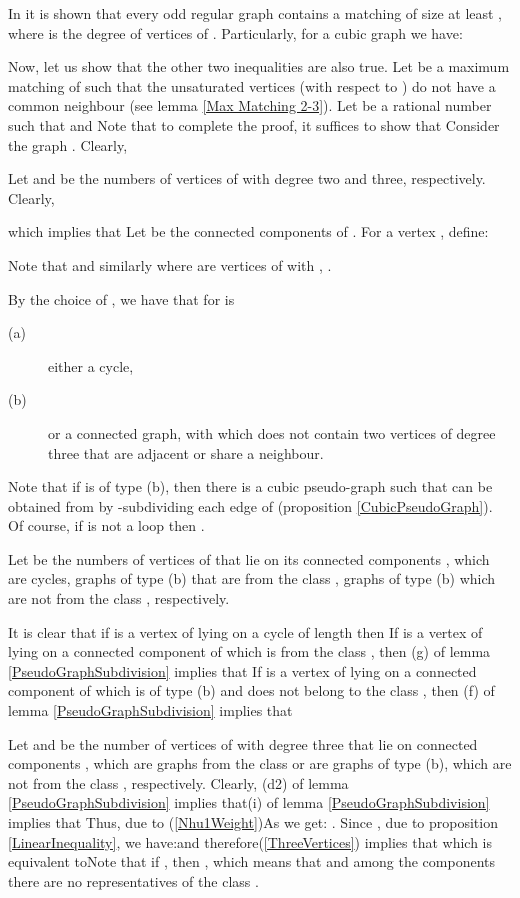 \documentclass[fleqn,12pt,twoside]{article}
\newenvironment{proof}[1][Proof.]{\begin{trivlist}
\item[\hskip \labelsep {\bfseries #1}]}{\end{trivlist}}
\begin{document}
\begin{proof}
In \cite{Takao} it is shown that every odd regular graph 
contains a matching of size at least , where  is the degree of
vertices of . Particularly, for a cubic graph  we have:

Now, let us show that the other two inequalities are also true. Let
 be a
maximum matching of  such that the unsaturated vertices (with respect to ) do not have a common neighbour (see lemma \ref{Max Matching 2-3}). Let  be a rational number such that  and
Note that to complete the proof, it suffices to show that
Consider the graph . Clearly,


Let  and  be the numbers of vertices of  with
degree
two and three, respectively. Clearly,

which implies that
Let  be the connected components of . For a vertex ,  define:


Note that
and similarly
where  are vertices of  with
, .

By the choice of , we have that for   is

\begin{description}
\item[(a)] either a cycle,

\item[(b)] or a connected graph, with 
which does not contain two vertices of degree three that are
adjacent or share a neighbour.
\end{description}

Note that if  is of type (b), then there is a cubic pseudo-graph  such that  can be obtained from  by -subdividing each edge  of  (proposition \ref{CubicPseudoGraph}). Of course, if  is not a loop then .

Let  be the numbers of vertices of  that lie
on its connected components , which are cycles,
graphs of type (b) that are from the class , graphs of
type (b) which are not from the class , respectively.

It is clear that if  is a vertex of  lying on
a cycle of length  then
If  is a vertex of  lying on a connected component  of  which is from the class ,
then (g) of lemma \ref{PseudoGraphSubdivision} implies that
If  is a vertex of  lying on a connected component  of  which is of type (b) and does not belong
to the class , then (f) of lemma
\ref{PseudoGraphSubdivision} implies
that

Let  and  be the number of vertices of 
with degree three that lie on connected components
, which are graphs from the class  or
are graphs of type (b), which are not from the class ,
respectively. Clearly,
(d2) of lemma \ref{PseudoGraphSubdivision} implies that(i) of lemma \ref{PseudoGraphSubdivision} implies that
Thus, due to (\ref{Nhu1Weight})As  we get: . Since , due to proposition \ref{LinearInequality}, we have:and therefore(\ref{ThreeVertices}) implies that
which is equivalent toNote that if , then
, which means that  and among the components  there are no
representatives of the class .


\end{proof}
\end{document}
